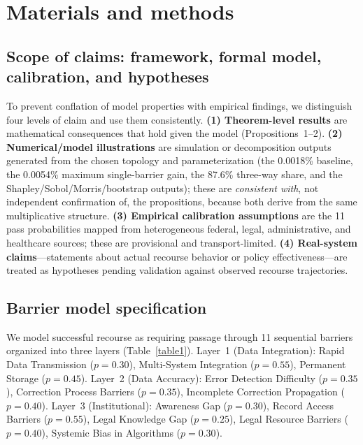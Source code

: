 \documentclass[10pt,letterpaper]{article}
\begin{document}
\section*{Materials and methods}

\subsection*{Scope of claims: framework, formal model, calibration, and hypotheses}
To prevent conflation of model properties with empirical findings, we distinguish four levels of claim and use them consistently. \textbf{(1) Theorem-level results} are mathematical consequences that hold given the model (Propositions~1--2). \textbf{(2) Numerical/model illustrations} are simulation or decomposition outputs generated from the chosen topology and parameterization (the 0.0018\% baseline, the 0.0054\% maximum single-barrier gain, the 87.6\% three-way share, and the Shapley/Sobol/Morris/bootstrap outputs); these are \emph{consistent with}, not independent confirmation of, the propositions, because both derive from the same multiplicative structure. \textbf{(3) Empirical calibration assumptions} are the 11 pass probabilities mapped from heterogeneous federal, legal, administrative, and healthcare sources; these are provisional and transport-limited. \textbf{(4) Real-system claims}---statements about actual recourse behavior or policy effectiveness---are treated as hypotheses pending validation against observed recourse trajectories.

\subsection*{Barrier model specification}
We model successful recourse as requiring passage through 11 sequential barriers organized into three layers (Table~\ref{table1}). Layer~1 (Data Integration): Rapid Data Transmission ($p=0.30$), Multi-System Integration ($p=0.55$), Permanent Storage ($p=0.45$). Layer~2 (Data Accuracy): Error Detection Difficulty ($p=0.35$), Correction Process Barriers ($p=0.35$), Incomplete Correction Propagation ($p=0.40$). Layer~3 (Institutional): Awareness Gap ($p=0.30$), Record Access Barriers ($p=0.55$), Legal Knowledge Gap ($p=0.25$), Legal Resource Barriers ($p=0.40$), Systemic Bias in Algorithms ($p=0.30$).
\end{document}
